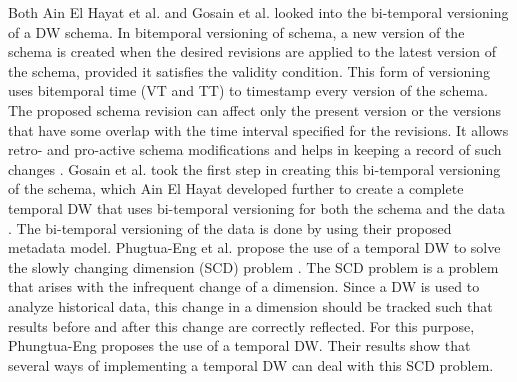 \documentclass[11pt]{article}
\begin{document}
Both Ain El Hayat et al. and Gosain et al. looked into the bi-temporal versioning of a DW schema. In bitemporal versioning of schema, a new version of the schema is created when the desired revisions are applied to the latest version of the schema, provided it satisfies the validity condition. This form of versioning uses bitemporal time (VT and TT) to timestamp every version of the schema. The proposed schema revision can affect only the present version or the versions that have some overlap with the time interval specified for the revisions. It allows retro- and pro-active schema modifications and helps in keeping a record of such changes \cite{Gosain2018357}. Gosain et al. took the first step in creating this bi-temporal versioning of the schema, which Ain El Hayat developed further to create a complete temporal DW that uses bi-temporal versioning for both the schema and the data \cite{AinElHayat2019314}. The bi-temporal versioning of the data is done by using their proposed metadata model. Phugtua-Eng et al. propose the use of a temporal DW to solve the slowly changing dimension (SCD) problem \cite{Phungtua-Eng2022214}. The SCD problem is a problem that arises with the infrequent change of a dimension. Since a DW is used to analyze historical data, this change in a dimension should be tracked such that results before and after this change are correctly reflected. For this purpose, Phungtua-Eng proposes the use of a temporal DW. Their results show that several ways of implementing a temporal DW can deal with this SCD problem. \\
\end{document}
